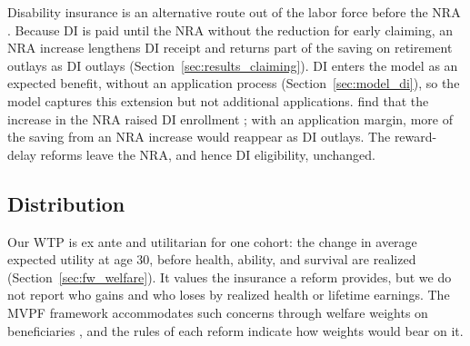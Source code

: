 Disability insurance is an alternative route out of the labor force before the NRA \citep{Yu2024}. Because DI is paid until the NRA without the reduction for early claiming, an NRA increase lengthens DI receipt and returns part of the saving on retirement outlays as DI outlays (Section~\ref{sec:results_claiming}). DI enters the model as an expected benefit, without an application process (Section~\ref{sec:model_di}), so the model captures this extension but not additional applications. \citet{Duggan2007aching} find that the increase in the NRA raised DI enrollment \citep[see also][]{Li2018}; with an application margin, more of the saving from an NRA increase would reappear as DI outlays. The reward-delay reforms leave the NRA, and hence DI eligibility, unchanged.

\subsection{Distribution}\label{sec:disc_distribution}

Our WTP is ex ante and utilitarian for one cohort: the change in average expected utility at age 30, before health, ability, and survival are realized (Section~\ref{sec:fw_welfare}). It values the insurance a reform provides, but we do not report who gains and who loses by realized health or lifetime earnings. The MVPF framework accommodates such concerns through welfare weights on beneficiaries \citep{hendren2016policy,hendren2020unified,saez2016generalized}, and the rules of each reform indicate how weights would bear on it.

